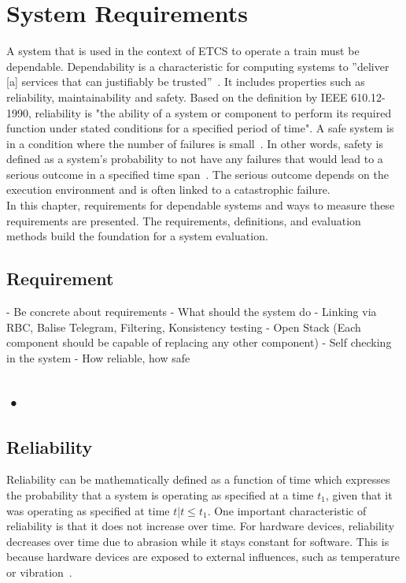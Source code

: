 \chapter{System Requirements}
\label{chptr:system_requirements}

A system that is used in the context of ETCS to operate a train must be dependable.
Dependability is a characteristic for computing systems to ''deliver [a] services that can justifiably be trusted''~\cite{AvizienisDependability2001}.
It includes properties such as reliability, maintainability and safety.
Based on the definition by IEEE 610.12-1990, reliability is "the ability of a system or component to perform its required function under stated conditions for a specified period of time"\cite{ieee610.12}.
A safe system is in a condition where the number of failures is small~\cite{HollnagelSafety}.
In other words, safety is defined as a system's probability to not have any failures that would lead to a serious outcome in a specified time span~\cite{GeffroyMotetDependableComputing}.
The serious outcome depends on the execution environment and is often linked to a catastrophic failure.
\\

In this chapter, requirements for dependable systems and ways to measure these requirements are presented.
The requirements, definitions, and evaluation methods build the foundation for a system evaluation.

\section{Requirement}
- Be concrete about requirements
	- What should the system do
		- Linking via RBC, Balise Telegram, Filtering, Konsistency testing
		- Open Stack (Each component should be capable of replacing any other component)
		- Self checking in the system
	- How reliable, how safe

\section{•}



\section{Reliability}

Reliability can be mathematically defined as a function of time which expresses the probability that a system is operating as specified at a time $t_1$, given that it was operating as specified at time $t | t \leq t_1$.
One important characteristic of reliability is that it does not increase over time.
For hardware devices, reliability decreases over time due to abrasion while it stays constant for software.
This is because hardware devices are exposed to external influences, such as temperature or vibration~\cite{GeffroyMotetDependableComputing}.

